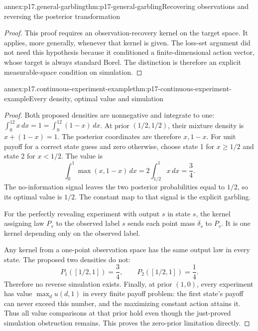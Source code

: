 \begin{annexitem}{annex:p17.general-garbling}{thm:p17-general-garbling}{Recovering observations and reversing the posterior transformation}
\begin{proof}
This proof requires an observation-recovery kernel on the target
space. It applies, more generally, whenever that kernel is given.
The loss-set argument did not need this hypothesis because it
conditioned a finite-dimensional action vector, whose target is
always standard Borel. The distinction is therefore an explicit
measurable-space condition on simulation.
\end{proof}
\end{annexitem}

\begin{annexitem}{annex:p17.continuous-experiment-example}{thm:p17-continuous-experiment-example}{Every density, optimal value and simulation}
\begin{proof}
Both proposed densities are nonnegative and integrate to one:
\(\int_0^12x\,dx=1=\int_0^12(1-x)\,dx\).
At prior \((1/2,1/2)\), their mixture density is
\(x+(1-x)=1\). The posterior coordinates are therefore \(x,1-x\).
For unit payoff for a correct state guess and zero otherwise,
choose state 1 for \(x\geq1/2\) and state 2 for \(x<1/2\).
The value is
\[
                  \int_0^1\max(x,1-x)\,dx
                       =2\int_{1/2}^1x\,dx=\frac34.
\]
The no-information signal leaves the two posterior probabilities
equal to \(1/2\), so its optimal value is \(1/2\).
The constant map to that signal is the explicit garbling.

For the perfectly revealing experiment with output \(s\) in state \(s\),
the kernel assigning law \(P_s\) to the observed label \(s\)
sends each point mass \(\delta_s\) to \(P_s\).
It is one kernel depending only on the observed label.

Any kernel from a one-point observation space has the same output
law in every state. The proposed two densities do not:
\[
             P_1([1/2,1])=\frac34,\qquad
             P_2([1/2,1])=\frac14.
\]
Therefore no reverse simulation exists.
Finally, at prior \((1,0)\), every experiment has value
\(\max_du(d,1)\) in every finite payoff problem: the first state's
payoff can never exceed this number, and the maximizing constant
action attains it. Thus all value comparisons at that prior hold
even though the just-proved simulation obstruction remains.
This proves the zero-prior limitation directly.
\end{proof}
\end{annexitem}
